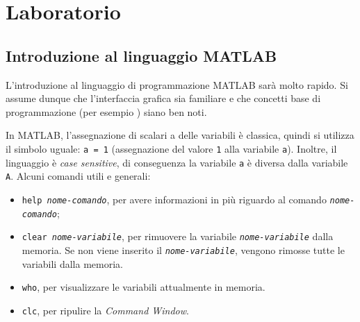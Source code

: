 \section{Laboratorio}

\subsection{Introduzione al linguaggio MATLAB}

L'introduzione al linguaggio di programmazione MATLAB sarà molto rapido. Si assume dunque che l'interfaccia grafica sia familiare e che concetti base di programmazione (per esempio ) siano ben noti.

\highspace
In MATLAB, l'assegnazione di scalari a delle variabili è classica, quindi si utilizza il simbolo uguale: \texttt{a = 1} (assegnazione del valore \texttt{1} alla variabile \texttt{a}). Inoltre, il linguaggio è \emph{case sensitive}, di conseguenza la variabile \texttt{a} è diversa dalla variabile \texttt{A}. Alcuni comandi utili e generali:
\begin{itemize}
    \item \texttt{help \emph{nome-comando}}, per avere informazioni in più riguardo al comando \texttt{\emph{nome-comando}};

    \item \texttt{clear \emph{nome-variabile}}, per rimuovere la variabile \texttt{\emph{nome-variabile}} dalla memoria. Se non viene inserito il \texttt{\emph{nome-variabile}}, vengono rimosse tutte le variabili dalla memoria.

    \item \texttt{who}, per visualizzare le variabili attualmente in memoria.

    \item \texttt{clc}, per ripulire la \emph{Command Window}.
\end{itemize}

